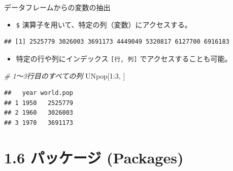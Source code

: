 \documentclass[
  ignorenonframetext,
]{beamer}
\newenvironment{Shaded}{\begin{snugshade}}{\end{snugshade}}
\newcommand{\CommentTok}[1]{\textcolor[rgb]{0.56,0.35,0.01}{\textit{#1}}}
\newcommand{\DecValTok}[1]{\textcolor[rgb]{0.00,0.00,0.81}{#1}}
\newcommand{\NormalTok}[1]{#1}
\newcommand{\SpecialCharTok}[1]{\textcolor[rgb]{0.00,0.00,0.00}{#1}}
\providecommand{\tightlist}{%
  \setlength{\itemsep}{0pt}\setlength{\parskip}{0pt}}
\begin{document}
\begin{frame}[fragile]{データフレームからの変数の抽出}
\protect\hypertarget{ux30c7ux30fcux30bfux30d5ux30ecux30fcux30e0ux304bux3089ux306eux5909ux6570ux306eux62bdux51fa}{}
\begin{itemize}
\tightlist
\item
  \texttt{\$} 演算子を用いて、特定の列（変数）にアクセスする。
\end{itemize}

\begin{Shaded}
\end{Shaded}

\begin{verbatim}
## [1] 2525779 3026003 3691173 4449049 5320817 6127700 6916183
\end{verbatim}

\begin{itemize}
\tightlist
\item
  特定の行や列にインデックス \texttt{{[}行,\ 列{]}}
  でアクセスすることも可能。
\end{itemize}

\begin{Shaded}
\begin{Highlighting}[]
\CommentTok{\# 1〜3行目のすべての列}
\NormalTok{UNpop[}\DecValTok{1}\SpecialCharTok{:}\DecValTok{3}\NormalTok{, ]}
\end{Highlighting}
\end{Shaded}

\begin{verbatim}
##   year world.pop
## 1 1950   2525779
## 2 1960   3026003
## 3 1970   3691173
\end{verbatim}
\end{frame}

\hypertarget{ux30d1ux30c3ux30b1ux30fcux30b8-packages}{%
\section{1.6 パッケージ
(Packages)}\label{ux30d1ux30c3ux30b1ux30fcux30b8-packages}}
\end{document}
